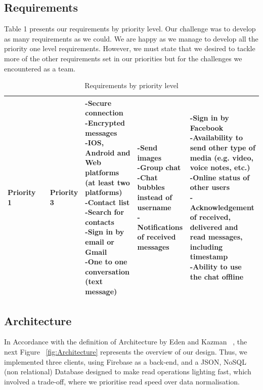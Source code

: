 
\subsection{Requirements}

Table 1 presents our requirements by priority level. Our challenge was to develop as many requirements as we could. We are happy as we manage to develop all the priority one level requirements. However, we must state that we desired to tackle more of the other requirements set in our priorities but for the challenges we encountered as a team.

\begin{table}[ht]
\caption{Requirements by priority level}
\label{tab:requirements}
    \begin{tabular}[c]{ | p{5cm} | p{5cm} | p{5cm} |}
		\hline
		\centering\textbf{Priority 1} &  & \centering\textbf{Priority 3} &
    \hline
    \parbox[t]{5cm}{-Secure connection\\-Encrypted messages\\ -IOS, Android and Web platforms (at least two platforms)\\ -Contact list\\ -Search for contacts\\ -Sign in by email or Gmail \\ -One to one conversation (text message)} &  \parbox[t]{5cm}{-Send images\\ -Group chat\\ -Chat bubbles instead of username\\ -Notifications of received messages}
& \parbox[t]{5cm}{-Sign in by Facebook\\ -Availability to send other type of media (e.g. video, voice notes, etc.)\\ -Online status of other users\\ -Acknowledgement of received, delivered and read messages, including timestamp\\ -Ability to use the chat offline}\\
    \hline
    \end{tabular}
\end{table}


\subsection{Architecture}

In Accordance with the definition of Architecture by Eden and Kazman ~\cite{eden2003architecture}, the next Figure  ~\ref{fig:Architecture}  represents the overview of our design. Thus, we implemented three clients, using Firebase as a back-end, and a JSON, NoSQL (non relational) Database designed to make read operations lighting fast, which involved a trade-off, where we prioritise read speed over data normalisation.

